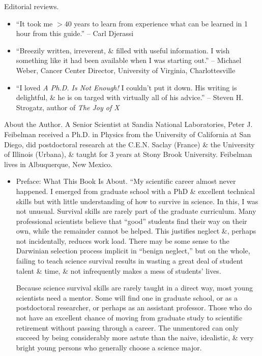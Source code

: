 \documentclass{article}
\begin{document}
\begin{enumerate}
	{\sf Editorial reviews.}
	\begin{itemize}
		\item ``It took me $> 40$ years to learn from experience what can be learned in 1 hour from this guide.'' -- {\sc Carl Djerassi}
		\item ``Breezily written, irreverent, \& filled with useful information. I wish something like it had been available when I was starting out.'' -- {\sc Michael Weber}, Cancer Center Director, University of Virginia, Charlottesville
		\item ``I loved {\it A Ph.D. Is Not Enough!} I couldn't put it down. His writing is delightful, \& he is on targed with virtually all of his advice.'' -- {\sc Steven H. Strogatz}, author of {\it The Joy of X}
	\end{itemize}
	{\sf About the Author.}  A Senior Scientist at Sandia National Laboratories, {\sc Peter J. Feibelman} received a Ph.D. in Physics from the University of California at San Diego, did postdoctoral research at the C.E.N. Saclay (France) \& the University of Illinois (Urbana), \& taught for 3 years at Stony Brook University. {\sc Feibelman} lives in Albuquerque, New Mexico.
	\begin{itemize}
		\item {\sf Preface: What This Book Is About.} ``My scientific career almost never happened. I emerged from graduate school with a PhD \& excellent technical skills but with little understanding of how to survive in science. In this, I was not unusual. Survival skills are rarely part of the graduate curriculum. Many professional scientists believe that ``good'' students find their way on their own, while the remainder cannot be helped. This justifies neglect \&, perhaps not incidentally, reduces work load. There may be some sense to the Darwinian selection process implicit in ``benign neglect,'' but on the whole, failing to teach science survival results in wasting a great deal of student talent \& time, \& not infrequently makes a mess of students' lives.
		
		Because science survival skills are rarely taught in a direct way, most young scientists need a mentor. Some will find one in graduate school, or as a postdoctoral researcher, or perhaps as an assistant professor. Those who do not have an excellent chance of moving from graduate study to scientific retirement without passing through a career. The unmentored can only succeed by being considerably more astute than the naive, idealistic, \& very bright young persons who generally choose a science major.
		

\end{itemize}
\end{enumerate}
\end{document}
